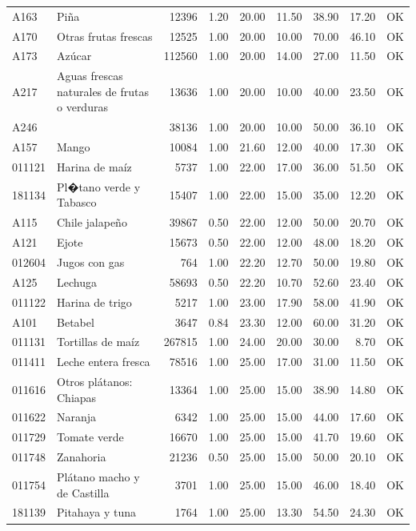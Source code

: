 \begin{table}[ht]
\begin{tabular}{llrrrrrrl}
  A163 & Piña & 12396 & 1.20 & 20.00 & 11.50 & 38.90 & 17.20 & OK \\ 
  A170 & Otras frutas frescas & 12525 & 1.00 & 20.00 & 10.00 & 70.00 & 46.10 & OK \\ 
  A173 & Azúcar & 112560 & 1.00 & 20.00 & 14.00 & 27.00 & 11.50 & OK \\ 
  A217 & Aguas frescas naturales de frutas o verduras & 13636 & 1.00 & 20.00 & 10.00 & 40.00 & 23.50 & OK \\ 
  A246 &  & 38136 & 1.00 & 20.00 & 10.00 & 50.00 & 36.10 & OK \\ 
  A157 & Mango & 10084 & 1.00 & 21.60 & 12.00 & 40.00 & 17.30 & OK \\ 
  011121 & Harina de maíz & 5737 & 1.00 & 22.00 & 17.00 & 36.00 & 51.50 & OK \\ 
  181134 & Pl�tano verde y Tabasco & 15407 & 1.00 & 22.00 & 15.00 & 35.00 & 12.20 & OK \\ 
  A115 & Chile jalapeño & 39867 & 0.50 & 22.00 & 12.00 & 50.00 & 20.70 & OK \\ 
  A121 & Ejote & 15673 & 0.50 & 22.00 & 12.00 & 48.00 & 18.20 & OK \\ 
  012604 & Jugos con gas & 764 & 1.00 & 22.20 & 12.70 & 50.00 & 19.80 & OK \\ 
  A125 & Lechuga & 58693 & 0.50 & 22.20 & 10.70 & 52.60 & 23.40 & OK \\ 
  011122 & Harina de trigo & 5217 & 1.00 & 23.00 & 17.90 & 58.00 & 41.90 & OK \\ 
  A101 & Betabel & 3647 & 0.84 & 23.30 & 12.00 & 60.00 & 31.20 & OK \\ 
  011131 & Tortillas de maíz & 267815 & 1.00 & 24.00 & 20.00 & 30.00 & 8.70 & OK \\ 
  011411 & Leche entera fresca & 78516 & 1.00 & 25.00 & 17.00 & 31.00 & 11.50 & OK \\ 
  011616 & Otros plátanos: Chiapas & 13364 & 1.00 & 25.00 & 15.00 & 38.90 & 14.80 & OK \\ 
  011622 & Naranja & 6342 & 1.00 & 25.00 & 15.00 & 44.00 & 17.60 & OK \\ 
  011729 & Tomate verde & 16670 & 1.00 & 25.00 & 15.00 & 41.70 & 19.60 & OK \\ 
  011748 & Zanahoria & 21236 & 0.50 & 25.00 & 15.00 & 50.00 & 20.10 & OK \\ 
  011754 & Plátano macho y de Castilla & 3701 & 1.00 & 25.00 & 15.00 & 46.00 & 18.40 & OK \\ 
  181139 & Pitahaya y tuna & 1764 & 1.00 & 25.00 & 13.30 & 54.50 & 24.30 & OK \\ 

\end{tabular}
\end{table}
